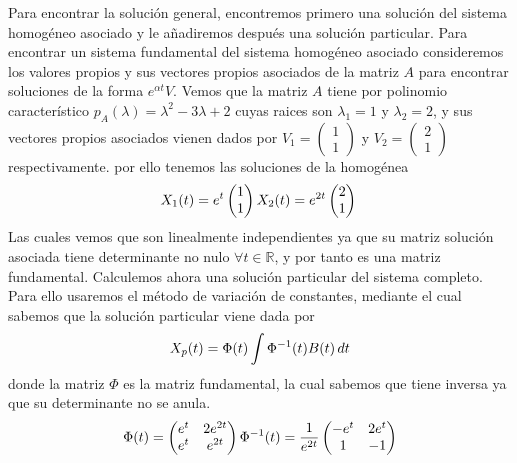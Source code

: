 \documentclass[fleqn]{article}
\def\R{\mathds{R}}
\begin{document}
    Para encontrar la solución general, encontremos primero una solución del sistema homogéneo asociado y le añadiremos después una solución particular. Para encontrar
    un sistema fundamental del sistema homogéneo asociado consideremos los valores propios y sus vectores propios asociados de la matriz $A$ para encontrar soluciones de la forma $e^{\alpha t}V$.
    Vemos que la matriz $A$ tiene por polinomio característico $p_A(\lambda) = \lambda^2 - 3\lambda + 2$ cuyas raices son $\lambda_1=1$ y $\lambda_2=2$, y sus vectores propios asociados vienen dados por
    $V_1 = \begin{pmatrix} 1\\1 \end{pmatrix}$ y $V_2 = \begin{pmatrix} 2\\1 \end{pmatrix}$ respectivamente. por ello tenemos las soluciones de la homogénea
    \begin{equation*}
        X_1(t)=e^t \begin{pmatrix} 1\\1 \end{pmatrix}\\
        X_2(t)=e^{2t} \begin{pmatrix} 2\\1 \end{pmatrix}\\
    \end{equation*}
    Las cuales vemos que son linealmente independientes ya que su matriz solución asociada tiene determinante no nulo $ \forall t \in \R$, y por tanto es una matriz fundamental. Calculemos ahora una solución particular del sistema completo.
    Para ello usaremos el método de variación de constantes, mediante el cual sabemos que la solución particular viene dada por 
    $$X_p(t) = \Phi(t) \int \Phi^{-1}(t)B(t) \thinspace dt$$
    donde la matriz $\Phi$ es la matriz fundamental, la cual sabemos que tiene inversa ya que su determinante no se anula. 
    \begin{equation*}
        \Phi(t) = 
        \begin{pmatrix}
            e^t & 2e^{2t}\\
            e^t & e^{2t}
        \end{pmatrix}\\
        \Phi^{-1}(t) = \frac{1}{e^{2t}}
        \begin{pmatrix}
            -e^t & 2e^t\\
            1 & -1
        \end{pmatrix}
    \end{equation*}
\end{document}
